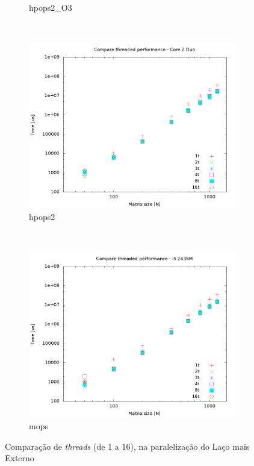 \documentclass[a4paper, 12pt]{article}
\begin{document}
\begin{figure}[H]
\begin{subfigure}[H]{0.5\textwidth}
        \caption{hpops2\_O3}
        \label{fig:hpops2_O3_par_threads}
    \end{subfigure}
    ~ %
    \begin{subfigure}[H]{0.5\textwidth}
        \includegraphics[width=\textwidth]{hpops2_par_threads}
        \caption{hpops2}
        \label{fig:hpops2_par_threads}
    \end{subfigure}%
    ~ %
    \begin{subfigure}[H]{0.5\textwidth}
        \includegraphics[width=\textwidth]{mops_par_threads}
        \caption{mops}
        \label{fig:mops_par_threads}
    \end{subfigure}
    \caption{Comparação de \textit{threads} (de 1 a 16), na paralelização do Laço mais Externo}\label{fig:animals}
\end{figure}
\end{document}
